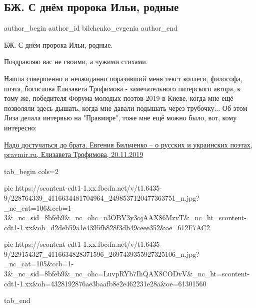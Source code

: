  
 
 
 
 
 
\subsection{БЖ. С днём пророка Ильи, родные}
\label{sec:02_08_2021.fb.bilchenko_evgenia.3.prorok_ilja}
 
\ifcmt
 author_begin
   author_id bilchenko_evgenia
 author_end
\fi

БЖ. С днём пророка Ильи, родные.

Поздравляю вас не своими, а чужими стихами. 

Нашла совершенно и неожиданно поразивший меня текст коллеги, философа, поэта,
богослова Елизавета Трофимова - замечательного питерского автора, к тому же,
победителя Форума молодых поэтов-2019 в Киеве, когда мне ещё позволяли здесь
дышать, когда мне давали подышать через трубочку... Об этом Лиза делала
интервью на "Правмире", тоже мне ещё можно было, вот, кому интересно: 

\href{https://www.pravmir.ru/nado-dostuchatsya-do-brata-evgeniya-bilchenko-o-russkih-i-ukrainskih-poetah}{%
Надо достучаться до брата. Евгения Бильченко – о русских и украинских поэтах, pravmir.ru, %
Елизавета Трофимова, %
20.11.2019%
}

\ifcmt
  tab_begin cols=2

     pic https://scontent-cdt1-1.xx.fbcdn.net/v/t1.6435-9/228764339_4116634481704964_2498537120477363751_n.jpg?_nc_cat=106&ccb=1-3&_nc_sid=8bfeb9&_nc_ohc=n3OBV3y3ojAAX86MzvT&_nc_ht=scontent-cdt1-1.xx&oh=d2deb59a1e4395fb828f3db49ceee352&oe=612F7AC2

     pic https://scontent-cdt1-1.xx.fbcdn.net/v/t1.6435-9/229154327_4116634828371596_2697439355927325106_n.jpg?_nc_cat=105&ccb=1-3&_nc_sid=8bfeb9&_nc_ohc=LuvpRYb7IhQAX8CODvV&_nc_ht=scontent-cdt1-1.xx&oh=4328192876ae3baafb8e2e462231e28a&oe=61301560

  tab_end
\fi

